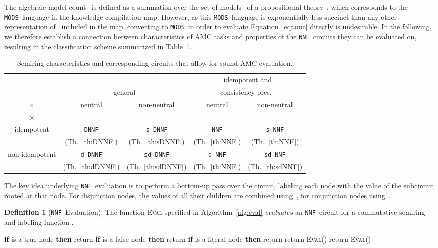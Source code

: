 \documentclass{article}
\theoremstyle{plain}
\theoremstyle{definition}
\newtheorem{definition}{Definition}
\newcommand{\NNF}{{\tt NNF}}
\newcommand{\dNNF}{{\tt d-NNF}}
\newcommand{\sNNF}{{\tt s-NNF}}
\newcommand{\DNNF}{{\tt DNNF}}
\newcommand{\dDNNF}{{\tt d-DNNF}}
\newcommand{\sDNNF}{{\tt s-DNNF}}
\newcommand{\sdDNNF}{{\tt sd-DNNF}}
\newcommand{\sdNNF}{{\tt sd-NNF}}
\newcommand{\MODS}{{\tt MODS}}
\begin{document}
The algebraic model count~ is defined as a summation over the set of
models~ of a propositional theory~, which corresponds to the \MODS\ language in
the knowledge compilation map. However, as this \MODS\ language is
exponentially less succinct than any other representation of~
included in the map,
converting to \MODS\ in order to evaluate Equation~\eqref{eq:amc}
directly is undesirable.
 In the following, we therefore establish a connection between
 characteristics of AMC
 tasks and properties of the \NNF\ circuits they can be evaluated on,
 resulting in the classification scheme summarized in Table~\ref{tab:eval}.

\begin{table}
\center
\begin{tabular}{c||c|c||c|c}
& \multicolumn{2}{c||}{} & \multicolumn{2}{c}{idempotent and}\\ 
& \multicolumn{2}{c||}{general } & \multicolumn{2}{c}{consistency-pres.~}\\ 
× & neutral & non-neutral & neutral & non-neutral \\ 
× &  & &  &  \\ \hline \hline
idempotent  & \DNNF & \sDNNF & \NNF & \sNNF\\ 
& (Th.~\ref{th:DNNF}) & (Th.~\ref{th:sDNNF}) & (Th.~\ref{th:NNF}) & (Th.~\ref{th:NNF})  \\ \hline
non-idempotent  & \dDNNF & \sdDNNF & \dNNF & \sdNNF \\
 & (Th.~\ref{th:dDNNF}) & (Th.~\ref{th:sdDNNF}) & (Th.~\ref{th:NNF}) & (Th.~\ref{th:sdNNF})
\end{tabular}
\caption{Semiring characteristics and corresponding circuits that
  allow for sound AMC evaluation.}\label{tab:eval}
\end{table}

The key idea underlying \NNF\ evaluation is to perform a bottom-up
pass over the circuit, labeling each node with the value of the
subcircuit rooted at that node. For disjunction nodes, the values of
all their 
children are combined using~, for conjunction nodes using~.
\begin{definition}[\NNF\ Evaluation]
The function \textsc{Eval} specified in Algorithm~\ref{alg:eval} \emph{evaluates} an \NNF\ circuit for a commutative semiring  and labeling function .
\end{definition}

\begin{algorithm}[t]
  \caption[\textsc{Label}]{Evaluating an \NNF\ circuit  for a
    commutative semiring  and labeling function .}
\label{alg:eval}
\begin{algorithmic}[1]
\STATE \textbf{if}  is a true node  \textbf{then} return 
\STATE \textbf{if}  is a false node  \textbf{then} return 
\STATE \textbf{if}  is a literal node  \textbf{then} return 
 \STATE return  \textsc{Eval}() \ENDIF
{} \STATE return  \textsc{Eval}() \ENDIF
\ENDFUNCTION
\end{algorithmic}
\end{algorithm}
\end{document}
